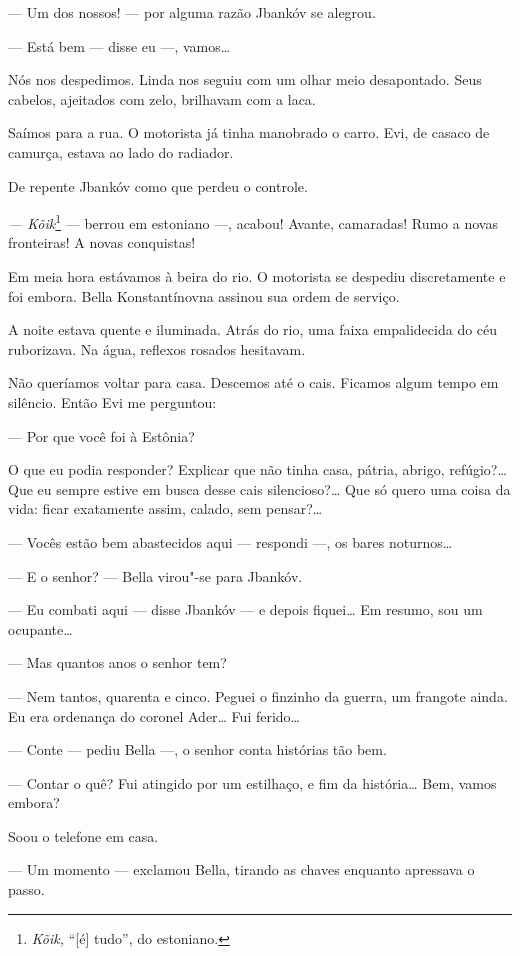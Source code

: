 --- Um dos nossos! --- por alguma razão Jbankóv se
alegrou.

--- Está bem --- disse eu ---, vamos\ldots{}

Nós nos despedimos. Linda nos seguiu com um olhar meio desapontado. Seus
cabelos, ajeitados com zelo, brilhavam com a laca.

Saímos para a rua. O motorista já tinha manobrado o carro. Evi, de
casaco de camurça, estava ao lado do radiador.

De repente Jbankóv como que perdeu o controle.

\emph{--- Kõik}\footnote{\emph{Kõik,} ``{[}é{]} tudo'', do estoniano.}
--- berrou em estoniano ---, acabou! Avante, camaradas!
Rumo a novas fronteiras! A novas conquistas!

Em meia hora estávamos à beira do rio. O motorista se despediu
discretamente e foi embora. Bella Konstantínovna assinou sua ordem de
serviço.

A noite estava quente e iluminada. Atrás do rio, uma faixa empalidecida
do céu ruborizava. Na água, reflexos rosados hesitavam.

Não queríamos voltar para casa. Descemos até o cais. Ficamos algum tempo
em silêncio. Então Evi me perguntou:

--- Por que você foi à Estônia?

O que eu podia responder? Explicar que não tinha casa, pátria, abrigo,
refúgio?\ldots{} Que eu sempre estive em busca desse cais silencioso?\ldots{} Que
só quero uma coisa da vida: ficar exatamente assim, calado, sem
pensar?\ldots{}

--- Vocês estão bem abastecidos aqui --- respondi
---, os bares noturnos\ldots{}

--- E o senhor? --- Bella virou"-se para Jbankóv.

--- Eu combati aqui --- disse Jbankóv --- e depois
fiquei\ldots{} Em resumo, sou um ocupante\ldots{}

--- Mas quantos anos o senhor tem?

--- Nem tantos, quarenta e cinco. Peguei o finzinho da guerra, um
frangote ainda. Eu era ordenança do coronel Ader\ldots{} Fui ferido\ldots{}

--- Conte --- pediu Bella ---, o senhor conta
histórias tão bem.

--- Contar o quê? Fui atingido por um estilhaço, e fim da
história\ldots{} Bem, vamos embora?

Soou o telefone em casa.

--- Um momento --- exclamou Bella, tirando as chaves
enquanto apressava o passo.

